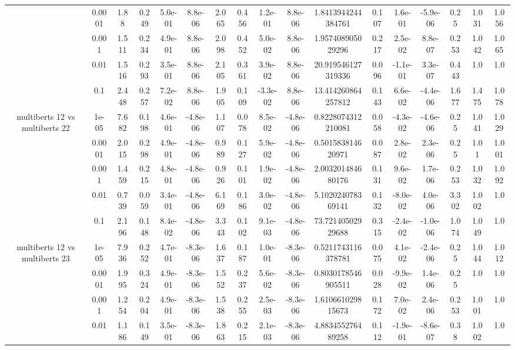 \begin{tabular}{|c|c|c|c|c|c|c|c|c|c|c|c|c|c|c|c|c|}
 & 0.0001 & 1.88 & 0.249 & 5.0e-01 & 8.8e-06 & 2.065 & 0.456 & 1.2e-01 & 8.8e-06 & 1.8413944244384761 & 0.107 & 1.6e-01 & -5.9e-06 & 0.25 & 1.031 & 1.056 \\
 & 0.001 & 1.511 & 0.234 & 4.9e-01 & 8.8e-06 & 2.098 & 0.452 & 5.0e-02 & 8.8e-06 & 1.957408905029296 & 0.217 & 2.5e-02 & 8.8e-07 & 0.253 & 1.042 & 1.065 \\
 & 0.01 & 1.516 & 0.293 & 3.5e-01 & 8.8e-06 & 2.105 & 0.361 & 3.9e-02 & 8.8e-06 & 20.919546127319336 & 0.096 & -1.1e-01 & 3.3e-07 & 0.443 & 1.0 & 1.0 \\
 & 0.1 & 2.448 & 0.257 & 7.2e-02 & 8.8e-06 & 1.905 & 0.109 & -3.3e-02 & 8.8e-06 & 13.414260864257812 & 0.143 & 6.6e-02 & -4.4e-06 & 1.677 & 1.475 & 1.078 \\
\hline
\multirow{5}{*}{multiberts 12 vs multiberts 22} & 1e-05 & 7.682 & 0.198 & 4.6e-01 & -4.8e-06 & 1.107 & 0.078 & 8.5e-02 & -4.8e-06 & 0.8228074312210081 & 0.058 & -4.3e-02 & -4.6e-06 & 0.25 & 1.041 & 1.029 \\
 & 0.0001 & 2.015 & 0.298 & 4.9e-01 & -4.8e-06 & 0.989 & 0.127 & 5.9e-02 & -4.8e-06 & 0.501583814620971 & 0.087 & 2.8e-02 & 2.3e-06 & 0.25 & 1.01 & 1.001 \\
 & 0.001 & 1.459 & 0.215 & 4.8e-01 & -4.8e-06 & 0.926 & 0.101 & 1.9e-02 & -4.8e-06 & 2.003201484680176 & 0.131 & 9.6e-02 & 1.7e-06 & 0.253 & 1.032 & 1.092 \\
 & 0.01 & 0.739 & 0.059 & 3.4e-01 & -4.8e-06 & 6.169 & 0.186 & 3.0e-02 & -4.8e-06 & 5.102024078369141 & 0.132 & -8.0e-02 & 4.0e-06 & 3.302 & 1.002 & 1.0 \\
 & 0.1 & 2.196 & 0.148 & 8.4e-02 & -4.8e-06 & 3.343 & 0.102 & 9.1e-03 & -4.8e-06 & 73.72140502929688 & 0.315 & -2.4e-02 & -1.0e-06 & 1.074 & 1.049 & 1.0 \\
\hline
\multirow{5}{*}{multiberts 12 vs multiberts 23} & 1e-05 & 7.936 & 0.252 & 4.7e-01 & -8.3e-06 & 1.637 & 0.187 & 1.0e-01 & -8.3e-06 & 0.5211743116378781 & 0.075 & 4.1e-02 & -2.4e-06 & 0.25 & 1.044 & 1.012 \\
 & 0.0001 & 1.995 & 0.324 & 4.9e-01 & -8.3e-06 & 1.552 & 0.237 & 5.6e-02 & -8.3e-06 & 0.8030178546905511 & 0.028 & -9.9e-02 & 1.4e-06 & 0.25 & 1.0 & 1.0 \\
 & 0.001 & 1.254 & 0.204 & 4.9e-01 & -8.3e-06 & 1.538 & 0.255 & 2.5e-03 & -8.3e-06 & 1.610661029815673 & 0.172 & 7.0e-02 & 2.4e-06 & 0.253 & 1.001 & 1.0 \\
 & 0.01 & 1.186 & 0.149 & 3.5e-01 & -8.3e-06 & 1.863 & 0.215 & 2.1e-03 & -8.3e-06 & 4.883455276489258 & 0.112 & -1.9e-01 & -8.6e-07 & 0.38 & 1.002 & 1.0 \\

\end{tabular}
